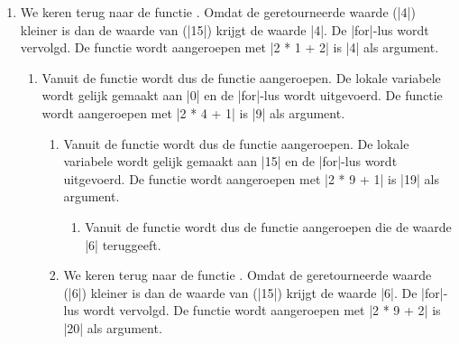 \begin{cpplstShortInline}
\begin{enumerate}[leftmargin=1.4em]
\begin{enumerate}[label*=\arabic*.,leftmargin=1.4em]
\begin{enumerate}[label*=\arabic*.,leftmargin=1.4em]
		\end{enumerate}
		\item
		We keren terug naar de functie .
		Omdat de geretourneerde waarde (|4|) kleiner is dan de waarde van  (|15|) krijgt  de waarde |4|.
		De |for|-lus wordt vervolgd.
		De functie  wordt aangeroepen met |2 * 1 + 2| is |4| als argument.
		\begin{enumerate}[label*=\arabic*.,leftmargin=1.4em]
			\item Vanuit de functie wordt dus de functie  aangeroepen.
			De lokale variabele  wordt gelijk gemaakt aan |0| en de |for|-lus wordt uitgevoerd.
			De functie  wordt aangeroepen met |2 * 4 + 1| is |9| als argument.
			\begin{enumerate}[label*=\arabic*.,leftmargin=1.4em]
				\item Vanuit de functie  wordt dus de functie  aangeroepen.
				De lokale variabele  wordt gelijk gemaakt aan |15| en de |for|-lus wordt uitgevoerd.
				De functie  wordt aangeroepen met |2 * 9 + 1| is |19| als argument.
				\begin{enumerate}[label*=\arabic*.,leftmargin=1.4em]
					\item Vanuit de functie  wordt dus de functie  aangeroepen die de waarde |6| teruggeeft.
				\end{enumerate}
				\item We keren terug naar de functie .
				Omdat de geretourneerde waar\-de (|6|) kleiner is dan de waarde van  (|15|) krijgt  de waarde |6|.
				De |for|-lus wordt vervolgd.
				De functie  wordt aangeroepen met |2 * 9 + 2| is |20| als argument.

\end{enumerate}
\end{enumerate}
\end{enumerate}
\end{enumerate}
\end{cpplstShortInline}
